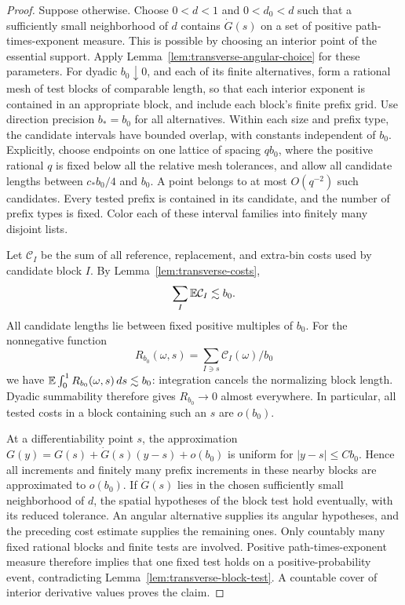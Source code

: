 \begin{proof}
Suppose otherwise.  Choose $0<d<1$ and $0<d_0<d$ such that a
sufficiently small neighborhood of $d$ contains $\dot G(s)$ on a
set of positive path-times-exponent measure.  This is possible by
choosing an interior point of the essential support.  Apply
Lemma~\ref{lem:transverse-angular-choice} for these parameters.
For dyadic $b_0\downarrow0$, and each of its finite alternatives,
form a rational mesh of test blocks of comparable length, so that
each interior exponent is contained in an appropriate block, and
include each block's finite prefix grid.  Use direction precision
$b_*=b_0$ for all alternatives.  Within each size and prefix type,
the candidate intervals have bounded overlap, with constants
independent of $b_0$.  Explicitly, choose endpoints on one lattice
of spacing $q b_0$, where the positive rational $q$ is fixed below
all the relative mesh tolerances, and allow all candidate lengths
between $c_*b_0/4$ and $b_0$.  A point belongs to at most
$O(q^{-2})$ such candidates.  Every tested prefix is contained in
its candidate, and the number of prefix types is fixed.  Color each
of these interval families into finitely many disjoint lists.

Let $\mathcal C_I$ be the sum of all reference, replacement, and
extra-bin costs used by candidate block $I$.  By
Lemma~\ref{lem:transverse-costs},
\begin{equation}\label{eq:transverse-mesh-cost}
 \sum_I\mathbb E\mathcal C_I\lesssim b_0.
\end{equation}
All candidate lengths lie between fixed positive multiples of $b_0$.
For the nonnegative function
\[
 R_{b_0}(\omega,s)=
       \sum_{I\ni s}\mathcal C_I(\omega)/b_0
\]
we have $\mathbb E\int_0^1R_{b_0}(\omega,s)\,ds\lesssim b_0$:
integration cancels the normalizing block length.  Dyadic summability
therefore gives $R_{b_0}\to0$ almost everywhere.  In particular,
all tested costs in a block containing such an $s$ are $o(b_0)$.

At a differentiability point $s$, the approximation
$G(y)=G(s)+\dot G(s)(y-s)+o(b_0)$ is uniform for
$|y-s|\le Cb_0$.  Hence all increments and finitely many prefix
increments in these nearby blocks are approximated to $o(b_0)$.
If $\dot G(s)$ lies in the chosen sufficiently small neighborhood
of $d$, the spatial hypotheses of the block test hold eventually,
with its reduced tolerance.  An angular alternative supplies its
angular hypotheses, and the preceding cost estimate supplies the
remaining ones.  Only countably many fixed rational blocks and
finite tests are involved.  Positive path-times-exponent measure
therefore implies that one fixed test holds on a positive-probability
event, contradicting Lemma~\ref{lem:transverse-block-test}.
A countable cover of interior derivative values proves the claim.
\end{proof}

